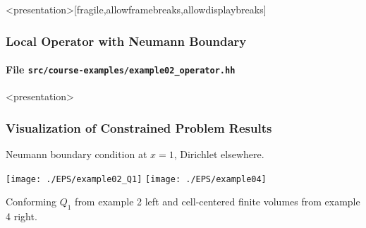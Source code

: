 \begin{frame}<presentation>[fragile,allowframebreaks,allowdisplaybreaks]
\frametitle<presentation>{Local Operator with Neumann Boundary}
\framesubtitle<presentation>{File \texttt{src/course-examples/example02\_operator.hh}}

\end{frame}

\begin{frame}<presentation>
\frametitle{Visualization of Constrained Problem Results}
Neumann boundary condition at $x=1$, Dirichlet elsewhere.

\begin{center}
\texttt{[image: ./EPS/example02\_Q1]} \hspace{1mm}
\texttt{[image: ./EPS/example04]}
\end{center}

Conforming $Q_1$ from example 2 left and cell-centered finite volumes from example 4 right.
\end{frame}


